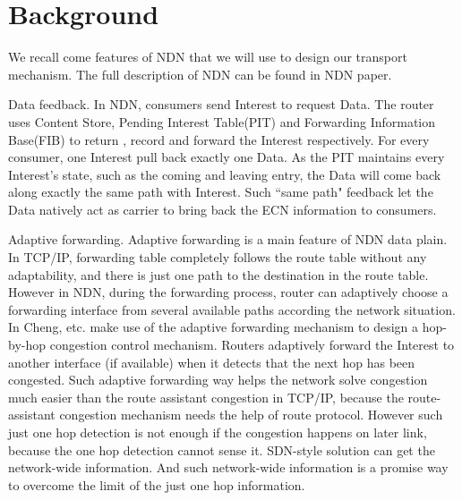
\section{Background}
We recall come features of NDN that we will use to design our transport mechanism. The full description of NDN can be found in NDN paper\cite{NDN}\cite{Adaptive}.

Data feedback. In NDN, consumers send Interest to request Data. The router uses Content Store, Pending Interest Table(PIT) and Forwarding Information Base(FIB) to return , record and forward the Interest respectively. For every consumer, one Interest pull back exactly one Data. As the PIT maintains every Interest's state, such as the coming and leaving entry, the Data will come back along exactly the same path with Interest. Such ``same path" feedback let the Data natively act as carrier to bring back the ECN information to consumers.

Adaptive forwarding. Adaptive forwarding is a main feature of NDN data plain. In TCP/IP, forwarding table completely follows the route table without any adaptability, and there is just one path to the destination in the route table. However in NDN, during the forwarding process, router can adaptively choose a forwarding interface from several available paths according the network situation. In \cite{Adaptive} Cheng, etc. make use of the adaptive forwarding mechanism to design a hop-by-hop congestion control mechanism. Routers adaptively forward the Interest to another interface (if available) when it detects that the next hop has been congested. Such adaptive forwarding way helps the network solve congestion much easier than the route assistant congestion in TCP/IP, because the route-assistant congestion mechanism needs the help of route protocol\cite{selfish}. However such just one hop detection is not enough if the congestion happens on later link, because the one hop detection cannot sense it.  SDN-style solution can get the network-wide information. And such network-wide information is a promise way to overcome the limit of the just one hop information.
